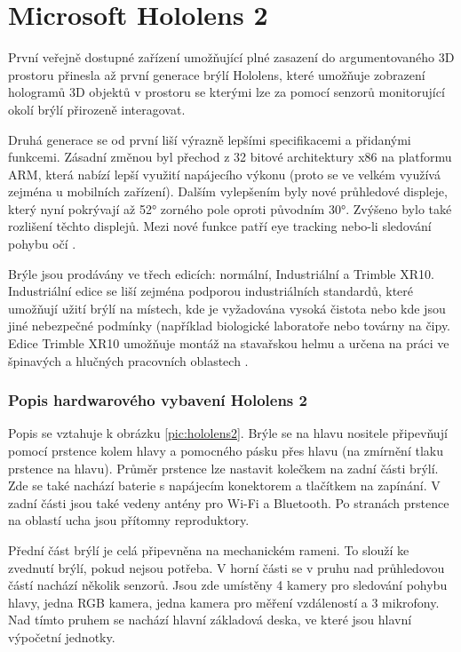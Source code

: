 \section{Microsoft Hololens 2} \label{sec:Hololens}
První veřejně dostupné zařízení umožňující plné zasazení do argumentovaného 3D prostoru přinesla až první generace brýlí Hololens, které umožňuje zobrazení hologramů 3D objektů v prostoru se kterými lze za pomocí senzorů monitorující okolí brýlí přirozeně interagovat. 

Druhá generace se od první liší výrazně lepšími specifikacemi a přidanými funkcemi. Zásadní změnou  byl přechod z 32 bitové architektury x86 na platformu ARM, která nabízí lepší využití napájecího výkonu (proto se ve velkém využívá zejména u mobilních zařízení). Dalším vylepšením byly nové průhledové displeje, který nyní pokrývají až 52° zorného pole oproti původním 30°. Zvýšeno bylo také rozlišení těchto displejů. Mezi nové funkce patří eye tracking nebo-li sledování pohybu očí \cite{hololens1/2difrences}.

Brýle jsou prodávány ve třech edicích: normální, Industriální a Trimble XR10. Industriální edice se liší zejména podporou industriálních standardů, které umožňují užití brýlí na místech, kde je vyžadována vysoká čistota nebo kde jsou jiné nebezpečné podmínky (například biologické laboratoře nebo továrny na čipy. Edice Trimble XR10 umožňuje montáž na stavařskou helmu a určena na práci ve špinavých a hlučných pracovních oblastech \cite{hololens2msOptions}.

\subsubsection{Popis hardwarového vybavení Hololens 2}
Popis se vztahuje k obrázku \ref{pic:hololens2}. Brýle se na hlavu nositele připevňují pomocí prstence kolem hlavy a pomocného pásku přes hlavu (na zmírnění tlaku prstence na hlavu). Průměr prstence lze nastavit kolečkem na zadní části brýlí. Zde se také nachází baterie s napájecím konektorem a tlačítkem na zapínání. V zadní části jsou také vedeny antény pro Wi-Fi a Bluetooth. Po stranách prstence na oblastí ucha jsou přítomny reproduktory. 

Přední část brýlí je celá připevněna na mechanickém rameni. To slouží ke zvednutí brýlí, pokud nejsou  potřeba. V horní části se v pruhu nad průhledovou částí nachází několik senzorů. Jsou zde umístěny 4 kamery pro sledování pohybu hlavy, jedna RGB kamera, jedna kamera pro měření vzdáleností a 3 mikrofony. Nad tímto pruhem se nachází hlavní základová deska, ve které jsou hlavní výpočetní jednotky.

